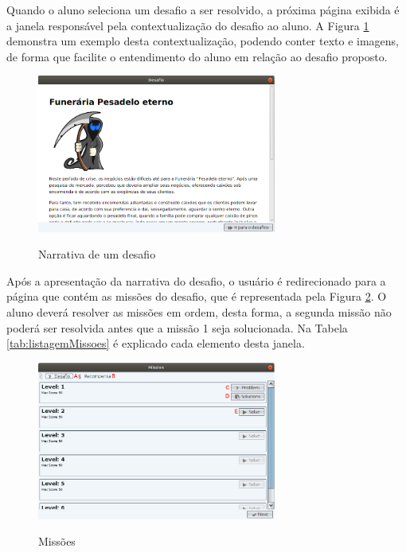\documentclass[
	12pt,				%
	oneside,			%
	a4paper,			%
	english,			%
	french,				%
	spanish,			%
	brazil,				%
	]{abntex2}
\begin{document}
Quando o aluno seleciona um desafio a ser resolvido, a próxima página exibida é a janela responsável pela contextualização do desafio ao aluno. A Figura \ref{fig:visnodeDesafiosNarrativa} demonstra um exemplo desta contextualização, podendo conter texto e imagens, de forma que facilite o entendimento do aluno em relação ao desafio proposto.

\begin{figure}[H]
\centering
\caption{Narrativa de um desafio}
\includegraphics[width=0.7\textwidth]{imagens/visnode_desafios_narrativa.png}
\sourceAuthor
\label{fig:visnodeDesafiosNarrativa}
\end{figure}

Após a apresentação da narrativa do desafio, o usuário é redirecionado para a página que contém as missões do desafio, que é representada pela Figura \ref{fig:visnodeMissoes}. O aluno deverá resolver as missões em ordem, desta forma, a segunda missão não poderá ser resolvida antes que a missão 1 seja solucionada. Na Tabela \ref{tab:listagemMissoes} é explicado cada elemento desta janela.

\begin{figure}[H]
\centering
\caption{Missões}
\includegraphics[width=0.7\textwidth]{imagens/visnode_missoes.png}
\sourceAuthor
\label{fig:visnodeMissoes}
\end{figure}
\end{document}
